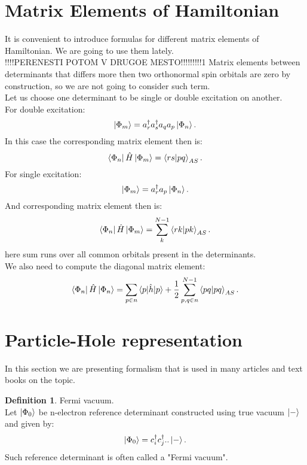 \documentclass[twoside,english]{uiofysmaster}
\theoremstyle{definition}
\newtheorem{defn}{Definition}
\begin{document}


\section{Matrix Elements of Hamiltonian}
It is convenient to introduce formulas for different matrix elements of Hamiltonian. We are going to use them lately. \\
!!!!PERENESTI POTOM V DRUGOE MESTO!!!!!!!!!1
Matrix elements between determinants that differs more then two orthonormal spin orbitals are zero by construction, so we are not going to consider such term.\\
Let us choose one determinant to be single or double excitation on another. \\
For double excitation:
\begin{equation}
\ket{\Phi_{m}}=a^\dagger_r a^\dagger_s a_q a_p \ket{\Phi_n}.
\end{equation}
In this case the corresponding matrix element then is:
\begin{equation}
\bra{\Phi_n} \hat{H}\ket{\Phi_{m}}=\braket{rs|pq}_{AS}.
\end{equation}
For single excitation:
\begin{equation}
\ket{\Phi_{m}}=a^\dagger_r  a_p \ket{\Phi_n}.
\end{equation}
And corresponding matrix element then is:
\begin{equation}
\bra{\Phi_n} \hat{H}\ket{\Phi_{m}}=\sum_{k}^{N-1}\braket{rk|pk}_{AS}.
\end{equation}
here sum runs over all common orbitals present in the determinants.\\
We also need to compute the diagonal matrix element:
\begin{equation}
\bra{\Phi_n} \hat{H}\ket{\Phi_{n}}=\sum_{p\in n} \braket{p|\hat{h}|p} + \frac{1}{2} \sum_{p,q \in n}^{N-1}\braket{pq|pq}_{AS}.
\end{equation}

\section{Particle-Hole representation}
In this section we are presenting formalism that is used in many articles and text books on the topic.\\

\begin{defn}Fermi vacuum.\\
	Let $\ket{\Phi_0}$ be n-electron reference determinant constructed using true vacuum $\ket{-}$ and given by:
	\[ \ket{\Phi_0} = c^\dagger_i c^\dagger_j ..\ket{-}. \]
	Such reference determinant is often called a "Fermi vacuum".
\end{defn}
\end{document}
